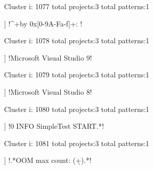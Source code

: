 Cluster i: 1077
total projects:3
total patterns:1
\begin{multicols}{1}
\begin{description}[noitemsep,topsep=0pt]
\item [[3] ] \cverb!^\s+by 0x[0-9A-Fa-f]+: !
\end{description}
\end{multicols}







Cluster i: 1078
total projects:3
total patterns:1
\begin{multicols}{1}
\begin{description}[noitemsep,topsep=0pt]
\item [[3] ] \cverb!Microsoft Visual Studio 9!
\end{description}
\end{multicols}







Cluster i: 1079
total projects:3
total patterns:1
\begin{multicols}{1}
\begin{description}[noitemsep,topsep=0pt]
\item [[3] ] \cverb!Microsoft Visual Studio 8!
\end{description}
\end{multicols}







Cluster i: 1080
total projects:3
total patterns:1
\begin{multicols}{1}
\begin{description}[noitemsep,topsep=0pt]
\item [[3] ] \cverb!0 INFO SimpleTest START.*!
\end{description}
\end{multicols}







Cluster i: 1081
total projects:3
total patterns:1
\begin{multicols}{1}
\begin{description}[noitemsep,topsep=0pt]
\item [[3] ] \cverb!.*OOM max count: (\d+).*!
\end{description}
\end{multicols}







